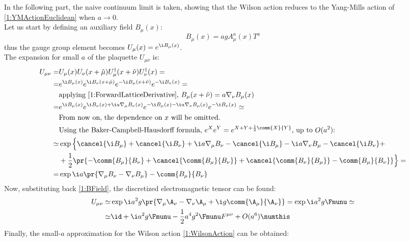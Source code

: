 In the following part, the naive continuum limit is taken, showing that the Wilson action reduces to the Yang-Mills action of \eqref{1:YMActionEuclidean} when $a\to0$.\\
Let us start by defining an auxiliary field $B_\mu(x)$:
\begin{equation}
    B_\mu(x) = a g A^a_\mu(x)T^a \label{1:BField}
\end{equation}
thus the gauge group element becomes $U_\mu(x)=e^{\i B_\mu(x)}$.\\
The expansion for small $a$ of the plaquette $U_{\mu\nu}$ is:
\begin{align*}
    U_{\mu\nu} =& U_\mu(x)U_\nu(x+\hat\mu)U^\dagger_\mu(x+\hat\nu)U^\dagger_\nu(x) = \\
    =& e^{\i B_\mu(x)}e^{\i B_\nu(x+\hat\mu)}e^{-\i B_\mu(x+\hat\nu)}e^{-\i B_\nu(x)} = \\
    &\text{applying \eqref{1:ForwardLatticeDerivative}, } B_\mu(x+\hat\nu) = a\nabla_\nu B_\mu(x) \\
    =& e^{\i B_\mu(x)}e^{\i B_\nu(x)+\i a\nabla_\mu B_\nu(x)}e^{-\i B_\mu(x)-\i a\nabla_\nu B_\mu(x)}e^{-\i B_\nu(x)} \simeq \\
    &\text{From now on, the dependence on $x$ will be omitted.}\\
    &\text{Using the Baker-Campbell-Hausdorff formula, } e^Xe^Y = e^{X+Y+\frac12\comm{X}{Y}}\text{, up to $O(a^2)$:} \\
    \simeq& \exp\Big\{\cancel{\i B_\mu} + \cancel{\i B_\nu} + \i a \nabla_\mu B_\nu - \cancel{\i B_\mu} - \i a \nabla_\nu B_\mu - \cancel{\i B_\nu}+\\
    &+\frac12\pr{-\comm{B_\mu}{B_\nu}+\cancel{\comm{B_\mu}{B_\nu}}+\cancel{\comm{B_\nu}{B_\mu}}-\comm{B_\mu}{B_\nu}}\Big\} = \\
    =& \exp{\i a\pr{\nabla_\mu B_\nu - \nabla_\nu B_\mu} - \comm{B_\mu}{B_\nu}}
\end{align*}
Now, substituting back \eqref{1:BField}, the discretized electromagnetic tensor can be found:
\begin{align*}
    U_{\mu\nu} \simeq& \exp{\i a^2 g \pr{\nabla_\mu \A_\nu - \nabla_\nu \A_\mu+ \i g \comm{\A_\mu}{\A_\nu}}} =  \exp{\i a^2 g \Fmunu} \simeq \\
    \simeq& \id + \i a^2 g \Fmunu - \frac12 a^4 g^2 \Fmunu F^{\mu\nu} + O(a^6) \numthis \label{1:PlaquetteSmalla}
\end{align*}
Finally, the small-$a$ approximation for the Wilson action \eqref{1:WilsonAction} can be obtained:
